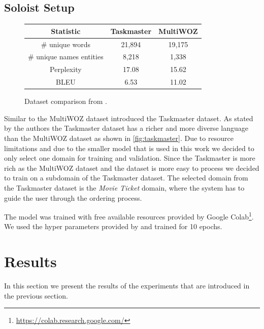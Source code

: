 \documentclass[twocolumn]{tum-article}
\begin{document}
\subsection{Soloist Setup}
\begin{figure}[!h]
\centering
\begin{tabular}{c|c|c}
\hline
\textbf{Statistic} & \textbf{Taskmaster} & \textbf{MultiWOZ}\\
\hline
\# unique words & 21,894 & 19,175 \\
\hline
\# unique names entities & 8,218 & 1,338 \\
\hline
Perplexity & 17.08 & 15.62 \\
\hline
BLEU & 6.53 & 11.02\\
\hline
\end{tabular}
\caption{Dataset comparison from \cite{byrne2019taskmaster}.}
\label{fig:taskmaster}
\end{figure}
Similar to the MultiWOZ dataset \cite{byrne2019taskmaster} introduced the Taskmaster dataset. As stated by the authors the Taskmaster dataset has a richer and more diverse language than the MultiWOZ dataset as shown in \autoref{fig:taskmaster}. Due to resource limitations and due to the smaller model that is used in this work we decided to only select one domain for training and validation. Since the Taskmaster is more rich as the MultiWOZ dataset and the dataset is more easy to process we decided to train on a subdomain of the Taskmaster dataset. The selected domain from the Taskmaster dataset is the \textit{Movie Ticket} domain, where the system has to guide the user through the ordering process. 

The model was trained with free available resources provided by Google Colab\footnote{\url{https://colab.research.google.com/}}. We used the hyper parameters provided by \cite{peng2020soloist} and trained for 10 epochs. 
\section{Results}
In this section we present the results of the experiments that are introduced in the previous section. 
\end{document}
